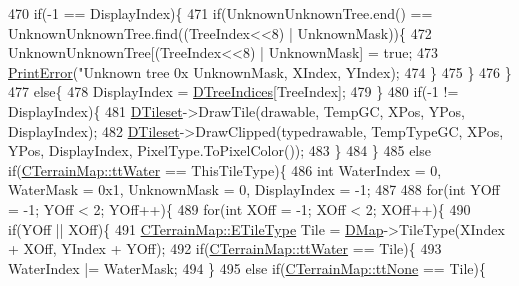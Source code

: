 \begin{DoxyCode}
{470                         \textcolor{keywordflow}{if}(-1 == DisplayIndex)\{
471                             \textcolor{keywordflow}{if}(UnknownUnknownTree.end() == UnknownUnknownTree.find((TreeIndex<<8) | 
      UnknownMask))\{
472                                 UnknownUnknownTree[(TreeIndex<<8) | UnknownMask] = \textcolor{keyword}{true};
473                                 \hyperlink{Debug_8h_a2ed825eefefe35baf59a93a8c641323d}{PrintError}(\textcolor{stringliteral}{"Unknown tree 0x%
      UnknownMask, XIndex, YIndex);   
474                             \}
475                         \}
476                     \}
477                     \textcolor{keywordflow}{else}\{
478                         DisplayIndex = \hyperlink{classCMapRenderer_a56708493a1499c671f4378204a0bfcb2}{DTreeIndices}[TreeIndex];  
479                     \}
480                     \textcolor{keywordflow}{if}(-1 != DisplayIndex)\{
481                         \hyperlink{classCMapRenderer_ace0648cba050b5e02431096edd15b836}{DTileset}->DrawTile(drawable, TempGC, XPos, YPos, DisplayIndex);
482                         \hyperlink{classCMapRenderer_ace0648cba050b5e02431096edd15b836}{DTileset}->DrawClipped(typedrawable, TempTypeGC, XPos, YPos, DisplayIndex, 
      PixelType.ToPixelColor());
483                     \}
484                 \}
485                 \textcolor{keywordflow}{else} \textcolor{keywordflow}{if}(\hyperlink{classCTerrainMap_aff2ab991e237269941416dd79d8871d4ab7c7a2abbef411fd768a4f209e307de5}{CTerrainMap::ttWater} == ThisTileType)\{
486                     \textcolor{keywordtype}{int} WaterIndex = 0, WaterMask = 0x1, UnknownMask = 0, DisplayIndex = -1;
487                     
488                     \textcolor{keywordflow}{for}(\textcolor{keywordtype}{int} YOff = -1; YOff < 2; YOff++)\{
489                         \textcolor{keywordflow}{for}(\textcolor{keywordtype}{int} XOff = -1; XOff < 2; XOff++)\{
490                             \textcolor{keywordflow}{if}(YOff || XOff)\{
491                                 \hyperlink{classCTerrainMap_aff2ab991e237269941416dd79d8871d4}{CTerrainMap::ETileType} Tile = 
      \hyperlink{classCMapRenderer_ab9a199c61aa1c87a3248af3085d8ba52}{DMap}->TileType(XIndex + XOff, YIndex + YOff);
492                                 \textcolor{keywordflow}{if}(\hyperlink{classCTerrainMap_aff2ab991e237269941416dd79d8871d4ab7c7a2abbef411fd768a4f209e307de5}{CTerrainMap::ttWater} == Tile)\{
493                                     WaterIndex |= WaterMask;   
494                                 \}
495                                 \textcolor{keywordflow}{else} \textcolor{keywordflow}{if}(\hyperlink{classCTerrainMap_aff2ab991e237269941416dd79d8871d4a481e779132fb16414d17870bd6229eb5}{CTerrainMap::ttNone} == Tile)\{
}}
\end{DoxyCode}
